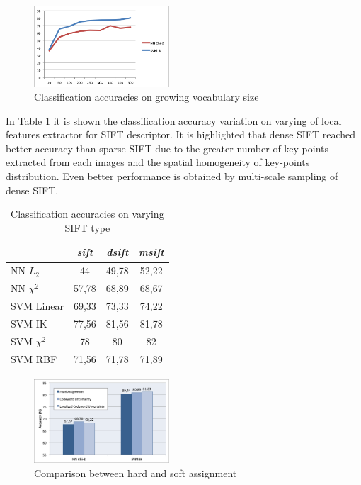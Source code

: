 \begin{figure}[h]
\begin{center}
\includegraphics[width=0.45\textwidth]{images/vocabulary.png}
\end{center}
  \caption{Classification accuracies on growing vocabulary size}
\label{fig:vocabulary}
\end{figure}

In Table \ref{tab:sifttype} it is shown the classification accuracy variation on varying of local features extractor for SIFT descriptor. It is highlighted that dense SIFT reached better accuracy than sparse SIFT due to the greater number of key-points extracted from each images and the spatial homogeneity of key-points distribution. Even better performance is obtained by multi-scale sampling of dense SIFT. 

\begin{table}[h]
\begin{center}
\begin{tabular}{|l|c|c|c|}
\hline
 & \emph{sift} & \emph{dsift} & \emph{msift}\\
\hline\hline
NN $L_2$ & 44 & 49,78 & 52,22\\
NN $\chi^2$ & 57,78 & 68,89 & 68,67\\
SVM Linear & 69,33 & 73,33 & 74,22\\
SVM IK & 77,56 & 81,56 & 81,78\\
SVM $\chi^2$ & 78 & 80 & 82\\
SVM RBF & 71,56 & 71,78 & 71,89 \\
\hline
\end{tabular}
\end{center}
\label{tab:sifttype}
\caption{Classification accuracies on varying SIFT type}
\end{table}




\begin{figure}[h]
\begin{center}
\includegraphics[width=0.45\textwidth]{images/soft-comparison.png}
\end{center}
  \caption{Comparison between hard and soft assignment}
\label{fig:vocabulary}
\end{figure}




